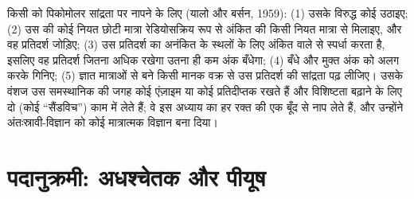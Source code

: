 \begin{method}[रेडियो-प्रतिरक्षा परीक्षण]\label{met:b3:endocrinology:ria}
किसी  को पिकोमोलर सांद्रता पर नापने के लिए (यालो और बर्सन,
1959): (1) उसके विरुद्ध कोई  उठाइए; (2) उस  की कोई
नियत छोटी मात्रा रेडियोसक्रिय रूप से अंकित  की किसी नियत मात्रा
से मिलाइए, और वह प्रतिदर्श जोड़िए; (3) उस प्रतिदर्श का अनंकित 
 के स्थलों के लिए अंकित वाले से स्पर्धा करता है, इसलिए वह
प्रतिदर्श जितना अधिक  रखेगा उतना ही कम अंक बँधेगा; (4) बँधे और
मुक्त अंक को अलग करके गिनिए; (5) ज्ञात मात्राओं से बने किसी मानक वक्र से
उस प्रतिदर्श की सांद्रता पढ़ लीजिए। उसके वंशज उस समस्थानिक की जगह कोई
एंज़ाइम या कोई प्रतिदीप्तक रखते हैं और विशिष्टता बढ़ाने के लिए दो
 (कोई ``सैंडविच'') काम में लेते हैं; वे इस अध्याय का हर
 रक्त की एक बूँद से नाप लेते हैं, और उन्होंने
अंतःस्रावी-विज्ञान को कोई मात्रात्मक विज्ञान बना दिया।
\end{method}

\section{पदानुक्रमी: अधश्चेतक और पीयूष}

